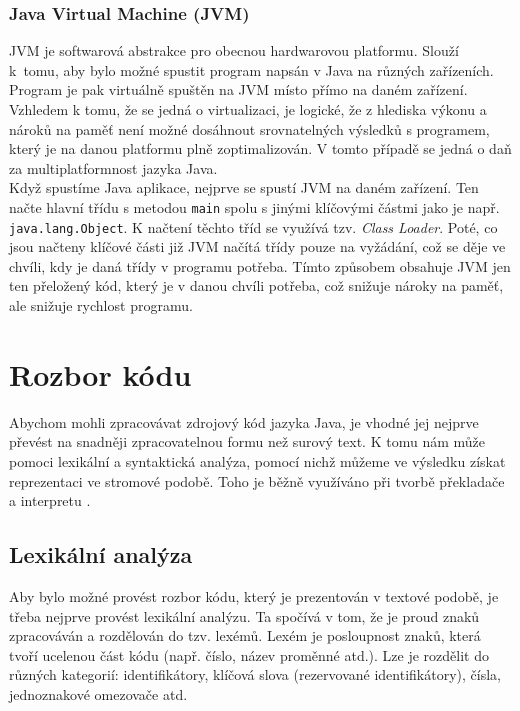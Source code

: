 			\subsubsection{Java Virtual Machine (JVM)}			
				JVM je softwarová abstrakce pro obecnou hardwarovou platformu. Slouží k~tomu, aby bylo možné spustit program napsán v Java na různých zařízeních. Program je pak virtuálně spuštěn na JVM místo přímo na daném zařízení. Vzhledem k tomu, že se jedná o virtualizaci, je logické, že z hlediska výkonu a nároků na paměť není možné dosáhnout srovnatelných výsledků s programem, který je na danou platformu plně zoptimalizován. V tomto případě se jedná o daň za multiplatformnost jazyka Java.\\ 
			
			Když spustíme Java aplikace, nejprve se spustí JVM na daném zařízení. Ten načte hlavní třídu s metodou \texttt{main} spolu s jinými klíčovými částmi jako je např. \texttt{java.lang.Object}. K načtení těchto tříd se využívá tzv. \emph{Class Loader}. Poté, co jsou načteny klíčové části již JVM načítá třídy pouze na vyžádání, což se děje ve chvíli, kdy je daná třídy v programu potřeba. Tímto způsobem obsahuje JVM jen ten přeložený kód, který je v danou chvíli potřeba, což snižuje nároky na paměť, ale snižuje rychlost programu. 
		
	\section{Rozbor kódu}
		Abychom mohli zpracovávat zdrojový kód jazyka Java, je vhodné jej nejprve převést na snadněji zpracovatelnou formu než surový text. K tomu nám může pomoci lexikální a syntaktická analýza, pomocí nichž můžeme ve výsledku získat reprezentaci ve stromové podobě. Toho je běžně využíváno při tvorbě překladače a interpretu \cite{compilerTutorial}\cite{basicsOfCompilerDesign}\cite{fjp}.
			
		\subsection{Lexikální analýza}
			Aby bylo možné provést rozbor kódu, který je prezentován v textové podobě, je třeba nejprve provést lexikální analýzu. Ta spočívá v tom, že je proud znaků zpracováván a rozdělován do tzv. lexémů. Lexém je posloupnost znaků, která tvoří ucelenou část kódu (např. číslo, název proměnné atd.). Lze je rozdělit do různých kategorií: identifikátory, klíčová slova (rezervované identifikátory), čísla, jednoznakové omezovače atd.\\
			
